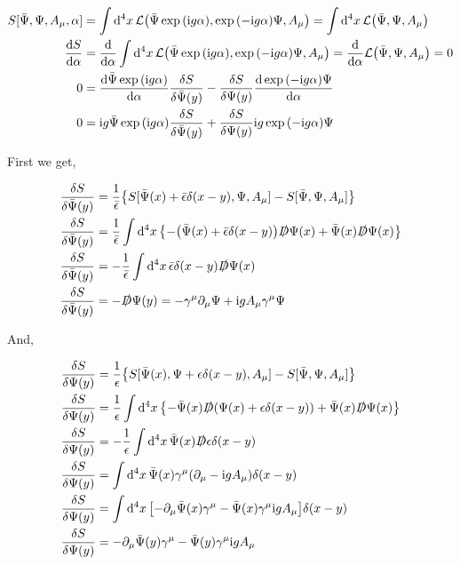 \begin{align}
    S[\bar\Psi,\Psi,A_\mu,\alpha]&=\int\dd[4]{x}\mathcal L\qty(\bar\Psi\exp\qty(\im g \alpha), \exp\qty(-\im g \alpha)\Psi, A_\mu)=\int\dd[4]{x}\mathcal L\qty(\bar\Psi, \Psi, A_\mu)\nonumber\\
    \dv{S}{\alpha}&=\dv{}{\alpha}\int\dd[4]{x}\mathcal L\qty(\bar\Psi\exp\qty(\im g \alpha), \exp\qty(-\im g \alpha)\Psi, A_\mu)=\dv{}{\alpha}\mathcal L\qty(\bar\Psi, \Psi, A_\mu)=0\nonumber\\
    0&=\dv{\bar\Psi\exp\qty(\im g \alpha)}{\alpha}\fdv{S}{\bar\Psi\qty(y)}-\fdv{S}{\Psi\qty(y)}\dv{\exp\qty(-\im g \alpha)\Psi}{\alpha}\nonumber\\
    0&=\im g\bar\Psi\exp\qty(\im g \alpha)\fdv{S}{\bar\Psi\qty(y)}+\fdv{S}{\Psi\qty(y)}\im g \exp\qty(-\im g \alpha)\Psi\nonumber
\end{align}

First we get,

\begin{align}
    \fdv{S}{\bar\Psi\qty(y)}&=\frac{1}{\bar\epsilon}\qty{S[\bar\Psi\qty(x)+\bar\epsilon\delta\qty(x-y),\Psi,A_\mu]-S[\bar\Psi,\Psi,A_\mu]}\nonumber\\
    \fdv{S}{\bar\Psi\qty(y)}&=\frac{1}{\bar\epsilon}\int\dd[4]{x}\qty{-\qty(\bar\Psi\qty(x)+\bar\epsilon\delta\qty(x-y))\slashed D\Psi\qty(x)+\bar\Psi\qty(x)\slashed D\Psi\qty(x)}\nonumber\\
    \fdv{S}{\bar\Psi\qty(y)}&=-\frac{1}{\bar\epsilon}\int\dd[4]{x}\bar\epsilon\delta\qty(x-y)\slashed D\Psi\qty(x)\nonumber\\
    \fdv{S}{\bar\Psi\qty(y)}&=-\slashed D\Psi\qty(y)=-\gamma^\mu\partial_\mu\Psi+\im g A_\mu \gamma^\mu \Psi\nonumber
\end{align}

And,

\begin{align}
    \fdv{S}{\Psi\qty(y)}&=\frac{1}{\epsilon}\qty{S[\bar\Psi\qty(x),\Psi+\epsilon\delta\qty(x-y),A_\mu]-S[\bar\Psi,\Psi,A_\mu]}\nonumber\\
    \fdv{S}{\Psi\qty(y)}&=\frac{1}{\epsilon}\int\dd[4]{x}\qty{-\bar\Psi\qty(x)\slashed D\qty(\Psi\qty(x)+\epsilon\delta\qty(x-y))+\bar\Psi\qty(x)\slashed D\Psi\qty(x)}\nonumber\\
    \fdv{S}{\Psi\qty(y)}&=-\frac{1}{\epsilon}\int\dd[4]{x}\bar\Psi\qty(x)\slashed D\epsilon\delta\qty(x-y)\nonumber\\
    \fdv{S}{\Psi\qty(y)}&=\int\dd[4]{x}\bar\Psi\qty(x)\gamma^\mu\qty(\partial_\mu-\im g A_\mu)\delta\qty(x-y)\nonumber\\
    \fdv{S}{\Psi\qty(y)}&=\int\dd[4]{x}\qty[-\partial_\mu\bar\Psi\qty(x)\gamma^\mu-\bar\Psi\qty(x)\gamma^\mu\im g A_\mu]\delta\qty(x-y)\nonumber\\
    \fdv{S}{\Psi\qty(y)}&=-\partial_\mu\bar\Psi\qty(y)\gamma^\mu-\bar\Psi\qty(y)\gamma^\mu\im g A_\mu\nonumber
\end{align}

